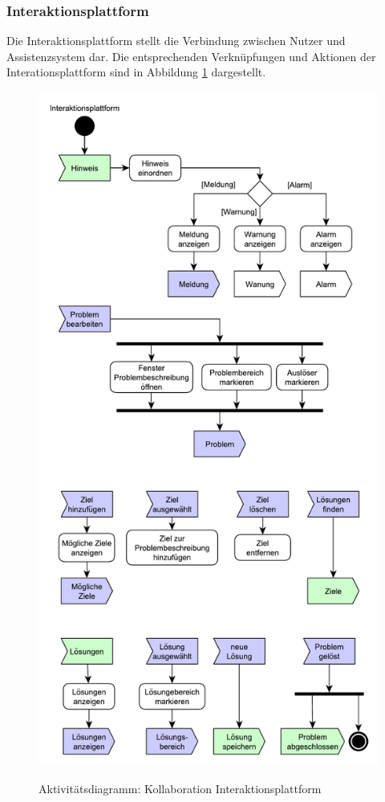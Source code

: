 \subsubsection*{Interaktionsplattform}
Die Interaktionsplattform stellt die Verbindung zwischen Nutzer und Assistenzsystem dar. Die entsprechenden Verknüpfungen und Aktionen der Interationsplattform sind in Abbildung \ref{pic:Kollaboration-Interaktionsplattform} dargestellt.

\begin{figure}[htbp]
\centering
\includegraphics[scale=0.5]{DA_files/UML/Konzept/Aktivitaetsdiagramm-Interaktionsplattform.pdf}
\label{pic:Kollaboration-Interaktionsplattform}
\caption{Aktivitätsdiagramm: Kollaboration Interaktionsplattform}
\end{figure}

